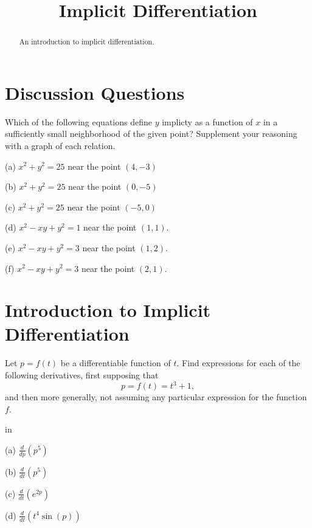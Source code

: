 \documentclass{ximera}
\title{Implicit Differentiation}
\newcommand{\pskip}{\vskip 0.1 in}
\begin{document}
\begin{abstract}
An introduction to implicit differentiation.
\end{abstract}
\maketitle

\section*{Discussion Questions}

\begin{question}  \label{Q:dsftr4tr656t}
Which of the following equations define $y$ implicty as a function of $x$ in a sufficiently small neighborhood of the given point? Supplement your reasoning with a graph of each relation.

(a) $x^2 + y^2 = 25$ near the point $(4,-3)$

(b) $x^2 + y^2 = 25$ near the point $(0,-5)$

(c) $x^2 + y^2 = 25$ near the point $(-5,0)$

(d) $x^2 - xy + y^2 = 1$ near the point $(1,1)$.

(e) $x^2 - xy + y^2 = 3$ near the point $(1,2)$.

(f) $x^2 - xy + y^2 = 3$ near the point $(2,1)$.

\end{question}

\section*{Introduction to Implicit Differentiation}

\begin{question}  \label{QDgbfb5566}
Let $p = f(t)$ be a differentiable function of $t$. Find expressions for each of the following derivatives, first supposing that
\[
       p = f(t) = t^3 + 1,
\]
and then more generally, not assuming any particular expression for the function $f$.

\pskip

(a) $\frac{d}{dp} \left(  p^5 \right)$

(b) $\frac{d}{dt} \left(  p^5 \right)$

(c)  $\frac{d}{dt} \left(  e^{2p} \right)$

(d) $\frac{d}{dt} \left( t^4 \sin(p) \right)$

\end{question}
\end{document}
